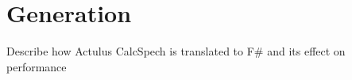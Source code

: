 \section{Generation}
Describe how Actulus CalcSpech is translated to F\# and its effect on performance